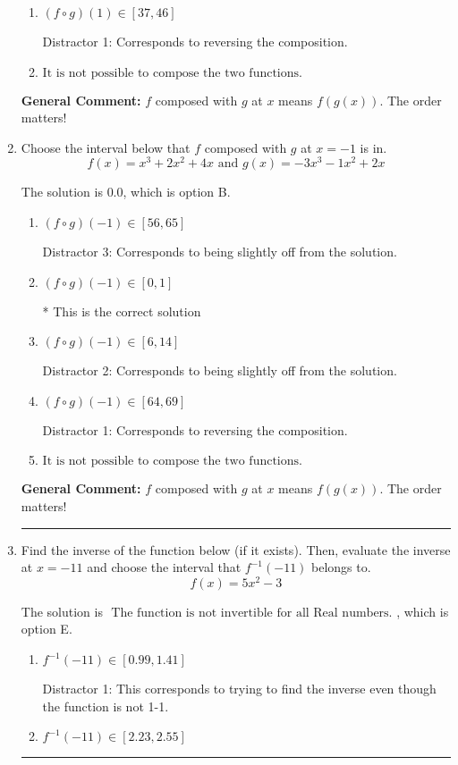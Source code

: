 \documentclass{extbook}[14pt]
\newcommand{\litem}[1]{\item #1

\rule{\textwidth}{0.4pt}}
\begin{document}
\begin{enumerate}
{\begin{enumerate}[label=\Alph*.]
 Distractor 3: Corresponds to being slightly off from the solution.
\item \( (f \circ g)(1) \in [37, 46] \)

 Distractor 1: Corresponds to reversing the composition.
\item \( \text{It is not possible to compose the two functions.} \)


\end{enumerate}

\textbf{General Comment:} $f$ composed with $g$ at $x$ means $f(g(x))$. The order matters!
}
\litem{
Choose the interval below that $f$ composed with $g$ at $x=-1$ is in.
\[ f(x) = x^{3} +2 x^{2} +4 x \text{ and } g(x) = -3x^{3} -1 x^{2} +2 x \]

The solution is \( 0.0 \), which is option B.\begin{enumerate}[label=\Alph*.]
\item \( (f \circ g)(-1) \in [56, 65] \)

 Distractor 3: Corresponds to being slightly off from the solution.
\item \( (f \circ g)(-1) \in [0, 1] \)

* This is the correct solution
\item \( (f \circ g)(-1) \in [6, 14] \)

 Distractor 2: Corresponds to being slightly off from the solution.
\item \( (f \circ g)(-1) \in [64, 69] \)

 Distractor 1: Corresponds to reversing the composition.
\item \( \text{It is not possible to compose the two functions.} \)


\end{enumerate}

\textbf{General Comment:} $f$ composed with $g$ at $x$ means $f(g(x))$. The order matters!
}
\litem{
Find the inverse of the function below (if it exists). Then, evaluate the inverse at $x = -11$ and choose the interval that $f^{-1}(-11)$ belongs to.
\[ f(x) = 5 x^2 - 3 \]

The solution is \( \text{ The function is not invertible for all Real numbers. } \), which is option E.\begin{enumerate}[label=\Alph*.]
\item \( f^{-1}(-11) \in [0.99, 1.41] \)

 Distractor 1: This corresponds to trying to find the inverse even though the function is not 1-1. 
\item \( f^{-1}(-11) \in [2.23, 2.55] \)


\end{enumerate}}
\end{enumerate}
\end{document}
